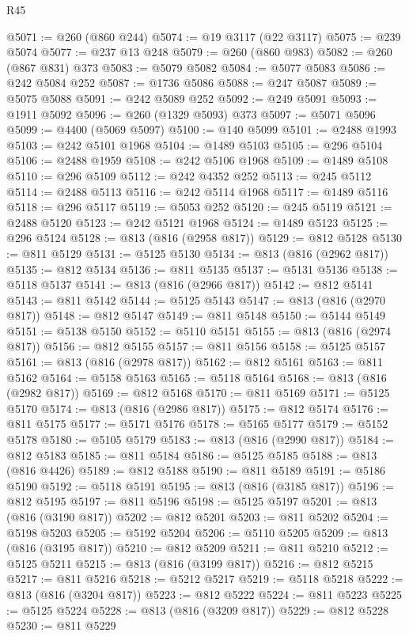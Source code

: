 \begin{lexlean}{R45}
\begin{coremodule}
{@5071 := @260 (@860 @244)
@5074 := @19 @3117 (@22 @3117)
@5075 := @239 @5074
@5077 := @237 @13 @248
@5079 := @260 (@860 @983)
@5082 := @260 (@867 @831) @373
@5083 := @5079 @5082
@5084 := @5077 @5083
@5086 := @242 @5084 @252
@5087 := @1736 @5086
@5088 := @247 @5087
@5089 := @5075 @5088
@5091 := @242 @5089 @252
@5092 := @249 @5091
@5093 := @1911 @5092
@5096 := @260 (@1329 @5093) @373
@5097 := @5071 @5096
@5099 := @4400 (@5069 @5097)
@5100 := @140 @5099
@5101 := @2488 @1993
@5103 := @242 @5101 @1968
@5104 := @1489 @5103
@5105 := @296 @5104
@5106 := @2488 @1959
@5108 := @242 @5106 @1968
@5109 := @1489 @5108
@5110 := @296 @5109
@5112 := @242 @4352 @252
@5113 := @245 @5112
@5114 := @2488 @5113
@5116 := @242 @5114 @1968
@5117 := @1489 @5116
@5118 := @296 @5117
@5119 := @5053 @252
@5120 := @245 @5119
@5121 := @2488 @5120
@5123 := @242 @5121 @1968
@5124 := @1489 @5123
@5125 := @296 @5124
@5128 := @813 (@816 (@2958 @817))
@5129 := @812 @5128
@5130 := @811 @5129
@5131 := @5125 @5130
@5134 := @813 (@816 (@2962 @817))
@5135 := @812 @5134
@5136 := @811 @5135
@5137 := @5131 @5136
@5138 := @5118 @5137
@5141 := @813 (@816 (@2966 @817))
@5142 := @812 @5141
@5143 := @811 @5142
@5144 := @5125 @5143
@5147 := @813 (@816 (@2970 @817))
@5148 := @812 @5147
@5149 := @811 @5148
@5150 := @5144 @5149
@5151 := @5138 @5150
@5152 := @5110 @5151
@5155 := @813 (@816 (@2974 @817))
@5156 := @812 @5155
@5157 := @811 @5156
@5158 := @5125 @5157
@5161 := @813 (@816 (@2978 @817))
@5162 := @812 @5161
@5163 := @811 @5162
@5164 := @5158 @5163
@5165 := @5118 @5164
@5168 := @813 (@816 (@2982 @817))
@5169 := @812 @5168
@5170 := @811 @5169
@5171 := @5125 @5170
@5174 := @813 (@816 (@2986 @817))
@5175 := @812 @5174
@5176 := @811 @5175
@5177 := @5171 @5176
@5178 := @5165 @5177
@5179 := @5152 @5178
@5180 := @5105 @5179
@5183 := @813 (@816 (@2990 @817))
@5184 := @812 @5183
@5185 := @811 @5184
@5186 := @5125 @5185
@5188 := @813 (@816 @4426)
@5189 := @812 @5188
@5190 := @811 @5189
@5191 := @5186 @5190
@5192 := @5118 @5191
@5195 := @813 (@816 (@3185 @817))
@5196 := @812 @5195
@5197 := @811 @5196
@5198 := @5125 @5197
@5201 := @813 (@816 (@3190 @817))
@5202 := @812 @5201
@5203 := @811 @5202
@5204 := @5198 @5203
@5205 := @5192 @5204
@5206 := @5110 @5205
@5209 := @813 (@816 (@3195 @817))
@5210 := @812 @5209
@5211 := @811 @5210
@5212 := @5125 @5211
@5215 := @813 (@816 (@3199 @817))
@5216 := @812 @5215
@5217 := @811 @5216
@5218 := @5212 @5217
@5219 := @5118 @5218
@5222 := @813 (@816 (@3204 @817))
@5223 := @812 @5222
@5224 := @811 @5223
@5225 := @5125 @5224
@5228 := @813 (@816 (@3209 @817))
@5229 := @812 @5228
@5230 := @811 @5229
}
\end{coremodule}
\end{lexlean}
